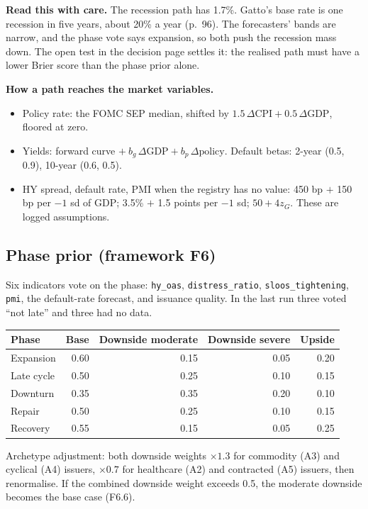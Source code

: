 \documentclass[10pt,a4paper]{article}
\begin{document}
\textbf{Read this with care.} The recession path has 1.7\%. Gatto's base rate is one recession in five years, about 20\% a year (p.~96). The forecasters' bands are narrow, and the phase vote says expansion, so both push the recession mass down. The open test in the decision page settles it: the realised path must have a lower Brier score than the phase prior alone.

\textbf{How a path reaches the market variables.}
\begin{itemize}
\item Policy rate: the FOMC SEP median, shifted by $1.5\,\Delta\text{CPI} + 0.5\,\Delta\text{GDP}$, floored at zero.
\item Yields: forward curve $+\ b_g\,\Delta\text{GDP} + b_p\,\Delta\text{policy}$. Default betas: 2-year (0.5, 0.9), 10-year (0.6, 0.5).
\item HY spread, default rate, PMI when the registry has no value: 450 bp $+$ 150 bp per $-1$ sd of GDP; 3.5\% $+$ 1.5 points per $-1$ sd; $50 + 4z_G$. These are logged assumptions.
\end{itemize}

\subsection{Phase prior (framework F6)}
Six indicators vote on the phase: \texttt{hy\_oas}, \texttt{distress\_ratio}, \texttt{sloos\_tightening}, \texttt{pmi}, the default-rate forecast, and issuance quality. In the last run three voted ``not late'' and three had no data.
\begin{center}
\begin{tabular}{lrrrr}
\toprule
Phase & Base & Downside moderate & Downside severe & Upside \\\midrule
Expansion & 0.60 & 0.15 & 0.05 & 0.20 \\
Late cycle & 0.50 & 0.25 & 0.10 & 0.15 \\
Downturn & 0.35 & 0.35 & 0.20 & 0.10 \\
Repair & 0.50 & 0.25 & 0.10 & 0.15 \\
Recovery & 0.55 & 0.15 & 0.05 & 0.25 \\
\bottomrule
\end{tabular}
\end{center}
Archetype adjustment: both downside weights $\times1.3$ for commodity (A3) and cyclical (A4) issuers, $\times0.7$ for healthcare (A2) and contracted (A5) issuers, then renormalise. If the combined downside weight exceeds 0.5, the moderate downside becomes the base case (F6.6).
\end{document}
